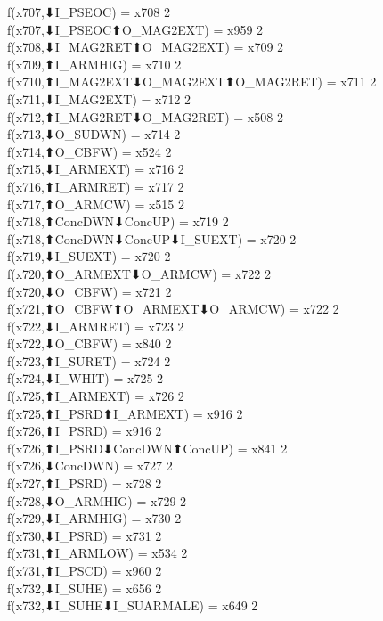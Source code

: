 f(x707,⬇I_PSEOC) = x708 {2} \\
f(x707,⬇I_PSEOC⬆O_MAG2EXT) = x959 {2} \\
f(x708,⬇I_MAG2RET⬆O_MAG2EXT) = x709 {2} \\
f(x709,⬆I_ARMHIG) = x710 {2} \\
f(x710,⬆I_MAG2EXT⬇O_MAG2EXT⬆O_MAG2RET) = x711 {2} \\
f(x711,⬇I_MAG2EXT) = x712 {2} \\
f(x712,⬆I_MAG2RET⬇O_MAG2RET) = x508 {2} \\
f(x713,⬇O_SUDWN) = x714 {2} \\
f(x714,⬆O_CBFW) = x524 {2} \\
f(x715,⬇I_ARMEXT) = x716 {2} \\
f(x716,⬆I_ARMRET) = x717 {2} \\
f(x717,⬆O_ARMCW) = x515 {2} \\
f(x718,⬆ConcDWN⬇ConcUP) = x719 {2} \\
f(x718,⬆ConcDWN⬇ConcUP⬇I_SUEXT) = x720 {2} \\
f(x719,⬇I_SUEXT) = x720 {2} \\
f(x720,⬆O_ARMEXT⬇O_ARMCW) = x722 {2} \\
f(x720,⬇O_CBFW) = x721 {2} \\
f(x721,⬆O_CBFW⬆O_ARMEXT⬇O_ARMCW) = x722 {2} \\
f(x722,⬇I_ARMRET) = x723 {2} \\
f(x722,⬇O_CBFW) = x840 {2} \\
f(x723,⬆I_SURET) = x724 {2} \\
f(x724,⬇I_WHIT) = x725 {2} \\
f(x725,⬆I_ARMEXT) = x726 {2} \\
f(x725,⬆I_PSRD⬆I_ARMEXT) = x916 {2} \\
f(x726,⬆I_PSRD) = x916 {2} \\
f(x726,⬆I_PSRD⬇ConcDWN⬆ConcUP) = x841 {2} \\
f(x726,⬇ConcDWN) = x727 {2} \\
f(x727,⬆I_PSRD) = x728 {2} \\
f(x728,⬇O_ARMHIG) = x729 {2} \\
f(x729,⬇I_ARMHIG) = x730 {2} \\
f(x730,⬇I_PSRD) = x731 {2} \\
f(x731,⬆I_ARMLOW) = x534 {2} \\
f(x731,⬆I_PSCD) = x960 {2} \\
f(x732,⬇I_SUHE) = x656 {2} \\
f(x732,⬇I_SUHE⬇I_SUARMALE) = x649 {2} \\
